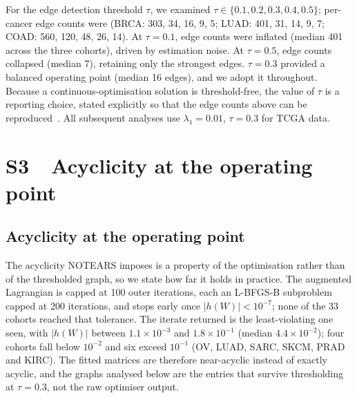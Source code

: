 \documentclass[11pt]{article}
\begin{document}
For the edge detection threshold $\tau$, we examined $\tau \in \{0.1, 0.2, 0.3, 0.4, 0.5\}$; per-cancer edge counts were (BRCA: 303, 34, 16, 9, 5; LUAD: 401, 31, 14, 9, 7; COAD: 560, 120, 48, 26, 14). At $\tau = 0.1$, edge counts were inflated (median 401 across the three cohorts), driven by estimation noise. At $\tau = 0.5$, edge counts collapsed (median 7), retaining only the strongest edges. $\tau = 0.3$ provided a balanced operating point (median 16 edges), and we adopt it throughout. Because a continuous-optimisation solution is threshold-free, the value of $\tau$ is a reporting choice, stated explicitly so that the edge counts above can be reproduced~\citep{zheng2018dags}. All subsequent analyses use $\lambda_1 = 0.01$, $\tau = 0.3$ for TCGA data.

\section*{S3\ \ Acyclicity at the operating point}

\subsection{Acyclicity at the operating point}
\label{si:acyclic}

The acyclicity NOTEARS imposes is a property of the optimisation rather than of the thresholded graph, so we state how far it holds in practice. The augmented Lagrangian is capped at 100 outer iterations, each an L-BFGS-B subproblem capped at 200 iterations, and stops early once $|h(W)| < 10^{-7}$; none of the 33 cohorts reached that tolerance. The iterate returned is the least-violating one seen, with $|h(W)|$ between $1.1 \times 10^{-3}$ and $1.8 \times 10^{-1}$ (median $4.4 \times 10^{-2}$); four cohorts fall below $10^{-2}$ and six exceed $10^{-1}$ (OV, LUAD, SARC, SKCM, PRAD and KIRC). The fitted matrices are therefore near-acyclic instead of exactly acyclic, and the graphs analysed below are the entries that survive thresholding at $\tau = 0.3$, not the raw optimiser output.
\end{document}
